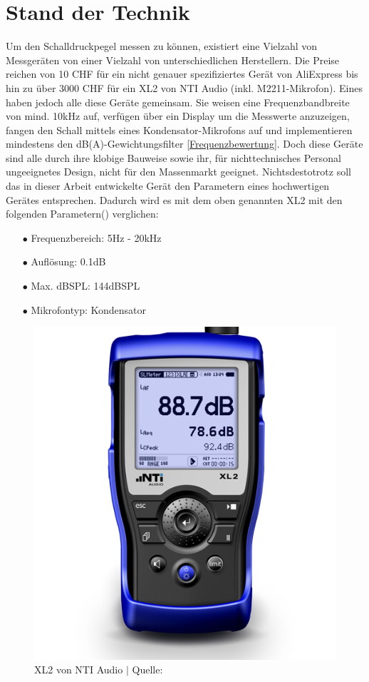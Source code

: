 \documentclass[12pt]{article}
\begin{document}
	\newpage
	\section{Stand der Technik}\label{Stand}
	Um den Schalldruckpegel messen zu können, existiert eine Vielzahl von Messgeräten von einer Vielzahl von unterschiedlichen Herstellern. Die Preise  reichen von 10 CHF für ein nicht genauer spezifiziertes Gerät von AliExpress bis hin zu über 3000 CHF für ein XL2 von NTI Audio (inkl. M2211-Mikrofon). Eines haben jedoch alle diese Geräte gemeinsam. Sie weisen eine Frequenzbandbreite von mind. 10kHz auf, verfügen über ein Display um die Messwerte anzuzeigen, fangen den Schall mittels eines Kondensator-Mikrofons auf und implementieren mindestens den dB(A)-Gewichtungsfilter \ref{Frequenzbewertung}. Doch diese Geräte sind alle durch ihre klobige Bauweise sowie ihr, für nichttechnisches Personal ungeeignetes Design, nicht für den Massenmarkt geeignet. Nichtsdestotrotz soll das in dieser Arbeit entwickelte Gerät den Parametern eines hochwertigen Gerätes entsprechen. Dadurch wird es mit dem oben genannten XL2 mit den folgenden Parametern(\cite{noauthor_xl2_nodate}) verglichen:
	\begin{itemize}[topsep=10pt,partopsep=0pt,labelwidth=5cm,align=left,itemindent=5cm]
		\item[$\bullet$ Frequenzbereich:]  5Hz - 20kHz
		\item[$\bullet$ Auflösung:]  0.1dB
		\item[$\bullet$ Max. dBSPL:]  144dBSPL
		\item[$\bullet$ Mikrofontyp:]  Kondensator
	\end{itemize}
	\begin{figure}[H]
		\centering
		\includegraphics[width=0.4\linewidth]{images/BAT_NTi-Audio-XL2-500}
		\caption{XL2 von NTI Audio $\vert$ Quelle: \cite{noauthor_xl2_nodate}}
		\label{fig:batnti-audio-xl2-500}
	\end{figure}
		
\end{document}

